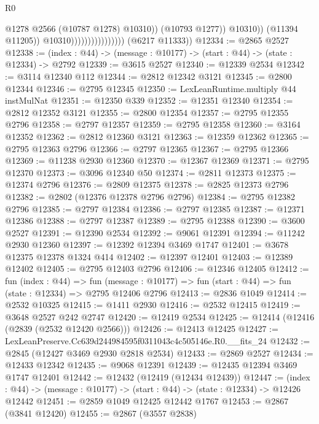\begin{lexlean}{R0}
\begin{coremodule}
                                                  @1278
                                                  @2566
                                                  (@10787 @1278)
                                                  @10310))
                                              (@10793 @1277))
                                            @10310))
                                        (@11394 @11205))
                                      @10310))))))))))))))))
      (@6217 @11333))
@12334 := @2865 @2527
@12338 := (index : @44) -> (message : @10177) -> (start : @44) -> (state : @12334) -> @2792
@12339 := @3615 @2527
@12340 := @12339 @2534
@12342 := @3114 @12340 @112
@12344 := @2812 @12342 @3121
@12345 := @2800 @12344
@12346 := @2795 @12345
@12350 := LexLeanRuntime.multiply @44 instMulNat
@12351 := @12350 @339
@12352 := @12351 @12340
@12354 := @2812 @12352 @3121
@12355 := @2800 @12354
@12357 := @2795 @12355 @2796
@12358 := @2797 @12357
@12359 := @2795 @12358
@12360 := @3164 @12352
@12362 := @2812 @12360 @3121
@12363 := @12359 @12362
@12365 := @2795 @12363 @2796
@12366 := @2797 @12365
@12367 := @2795 @12366
@12369 := @11238 @2930 @12360
@12370 := @12367 @12369
@12371 := @2795 @12370
@12373 := @3096 @12340 @50
@12374 := @2811 @12373
@12375 := @12374 @2796
@12376 := @2809 @12375
@12378 := @2825 @12373 @2796
@12382 := @2802 (@12376 @12378 @2796 @2796)
@12384 := @2795 @12382 @2796
@12385 := @2797 @12384
@12386 := @2797 @12385
@12387 := @12371 @12386
@12388 := @2797 @12387
@12389 := @2795 @12388
@12390 := @3600 @2527
@12391 := @12390 @2534
@12392 := @9061 @12391
@12394 := @11242 @2930 @12360
@12397 := @12392 @12394 @3469 @1747
@12401 := @3678 @12375 @12378 @1324 @414
@12402 := @12397 @12401
@12403 := @12389 @12402
@12405 := @2795 @12403 @2796
@12406 := @12346 @12405
@12412 := fun (index : @44) =>
  fun (message : @10177) => fun (start : @44) => fun (state : @12334) => @2795 @12406 @2796
@12413 := @2836 @1049
@12414 := @2532 @10325
@12415 := @1411 @2930
@12416 := @2532 @12415
@12419 := @3648 @2527 @242 @2747
@12420 := @12419 @2534
@12425 := @12414 (@12416 (@2839 (@2532 @12420 @2566)))
@12426 := @12413 @12425
@12427 := LexLeanPreserve.Cc639d244984595f0311043c4c505146e.R0.__fits_24
@12432 := @2845 (@12427 @3469 @2930 @2818 @2534)
@12433 := @2869 @2527
@12434 := @12433 @12342
@12435 := @9068 @12391
@12439 := @12435 @12394 @3469 @1747 @12401
@12442 := @12432 (@12419 (@12434 @12439))
@12447 := (index : @44) -> (message : @10177) -> (start : @44) -> (state : @12334) -> @12426 @12442
@12451 := @2859 @1049 @12425 @12442 @1767
@12453 := @2867 (@3841 @12420)
@12455 := @2867 (@3557 @2838)

\end{coremodule}
\end{lexlean}
